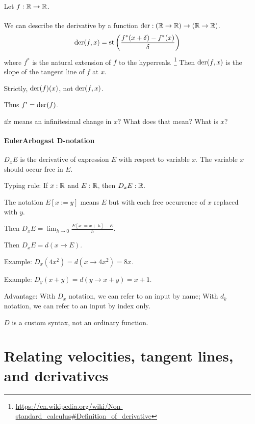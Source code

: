 Let \(f : \mathbb{R} \to \mathbb{R}\).

\paragraph{\der}

We can describe the derivative by a function \(\operatorname{der} : (\mathbb{R} \to \mathbb{R}) \to (\mathbb{R} \to \mathbb{R})\).
\[
    \operatorname{der}(f,x) = \operatorname{st}\left(\frac{f^*(x+\delta)-f^*(x)}{\delta}\right)
\]
where \(f^*\) is the natural extension of \(f\) to the hyperreals.%
\footnote{\url{https://en.wikipedia.org/wiki/Non-standard_calculus\#Definition_of_derivative}}
Then \(\operatorname{der}(f,x)\) is the slope of the tangent line of \(f\) at \(x\).

Strictly, \(\operatorname{der}(f)(x)\), not \(\operatorname{der}(f,x)\).

Thus \(f' = \operatorname{der}(f)\).

\(\dd{x}\) means an infinitesimal change in \(x\)?
What does that mean?
What is \(x\)?

\paragraph{Euler\textendash{}Arbogast D-notation}


\( D_x E \) is the derivative of expression \(E\) with respect to variable \(x\).
The variable \(x\) should occur free in \(E\).

Typing rule:
If \(x:\mathbb{R}\) and \(E:\mathbb{R}\), then \(D_x E:\mathbb{R}\).

The notation \(E[x:=y]\) means \(E\) but with each free occurrence of \(x\) replaced with \(y\).

Then \( D_x E = \lim_{h \to 0} \frac{E[x := x+h] - E}{h} \).

Then \( D_x E = d(x \to E) \).

Example: \( D_x (4x^2) = d(x \to 4x^2) = 8x \).

Example: \( D_y (x + y) = d(y \to x + y) = x + 1 \).

Advantage: With \(D_x\) notation, we can refer to an input by name;
With \(d_k\) notation, we can refer to an input by index only.

\(D\) is a custom syntax, not an ordinary function.


\section{Relating velocities, tangent lines, and derivatives}

